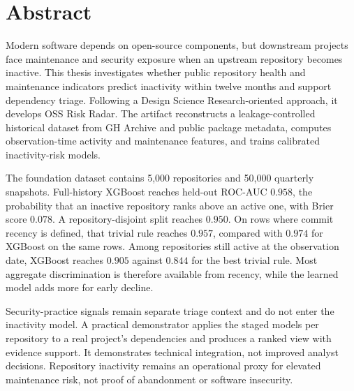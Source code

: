 \chapter*{Abstract}

Modern software depends on open-source components, but downstream projects face
maintenance and security exposure when an upstream repository becomes inactive. This
thesis investigates whether public repository health and maintenance indicators
predict inactivity within twelve months and support dependency triage. Following
a Design Science Research-oriented approach, it develops OSS Risk Radar. The
artifact reconstructs a leakage-controlled historical dataset from GH Archive
and public package metadata, computes observation-time activity and maintenance
features, and trains calibrated inactivity-risk models.

The foundation dataset contains 5{,}000 repositories and 50{,}000 quarterly
snapshots. Full-history XGBoost reaches held-out ROC-AUC \(0.958\), the
probability that an inactive repository ranks above an active one, with Brier
score \(0.078\). A repository-disjoint split reaches \(0.950\). On rows where
commit recency is defined, that trivial rule reaches \(0.957\), compared with
\(0.974\) for XGBoost on the same rows. Among repositories still active at the
observation date, XGBoost reaches \(0.905\) against \(0.844\) for the best
trivial rule. Most aggregate discrimination is therefore available from recency,
while the learned model adds more for early decline.

Security-practice signals remain separate triage context and do not enter the
inactivity model. A practical demonstrator applies the staged models per
repository to a real project's dependencies and produces a ranked view with
evidence support. It demonstrates technical integration, not improved analyst
decisions. Repository inactivity remains an operational proxy for elevated
maintenance risk, not proof of abandonment or software insecurity.
